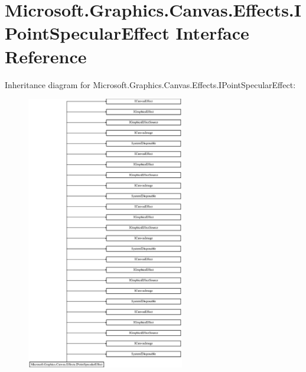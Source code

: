 \hypertarget{interface_microsoft_1_1_graphics_1_1_canvas_1_1_effects_1_1_i_point_specular_effect}{}\section{Microsoft.\+Graphics.\+Canvas.\+Effects.\+I\+Point\+Specular\+Effect Interface Reference}
\label{interface_microsoft_1_1_graphics_1_1_canvas_1_1_effects_1_1_i_point_specular_effect}
Inheritance diagram for Microsoft.\+Graphics.\+Canvas.\+Effects.\+I\+Point\+Specular\+Effect\+:\begin{figure}[H]
\begin{center}
\leavevmode
\includegraphics[height=12.000000cm]{interface_microsoft_1_1_graphics_1_1_canvas_1_1_effects_1_1_i_point_specular_effect}
\end{center}
\end{figure}
